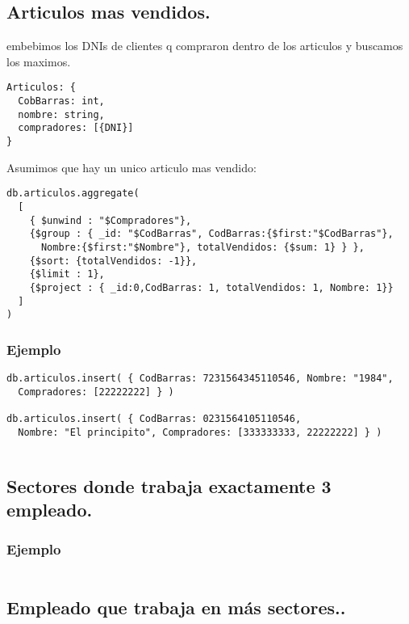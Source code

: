 \subsection{Articulos mas vendidos.}
embebimos los DNIs de clientes q compraron dentro de los articulos y buscamos los maximos.

\begin{lstlisting}
Articulos: {
  CobBarras: int,
  nombre: string,
  compradores: [{DNI}]
}
\end{lstlisting}

Asumimos que hay un unico articulo mas vendido:
\begin{lstlisting}
db.articulos.aggregate(
  [
    { $unwind : "$Compradores"},
    {$group : { _id: "$CodBarras", CodBarras:{$first:"$CodBarras"},
      Nombre:{$first:"$Nombre"}, totalVendidos: {$sum: 1} } },
    {$sort: {totalVendidos: -1}},
    {$limit : 1},
    {$project : { _id:0,CodBarras: 1, totalVendidos: 1, Nombre: 1}}
  ]
)
\end{lstlisting}

\subsubsection{Ejemplo}

\begin{lstlisting}
db.articulos.insert( { CodBarras: 7231564345110546, Nombre: "1984",
  Compradores: [22222222] } )

db.articulos.insert( { CodBarras: 0231564105110546,
  Nombre: "El principito", Compradores: [333333333, 22222222] } )
\end{lstlisting}

\begin{lstlisting}
\end{lstlisting}

\subsection{Sectores donde trabaja exactamente 3 empleado.}

\subsubsection{Ejemplo}
\begin{lstlisting}
\end{lstlisting}

\subsection{Empleado que trabaja en más sectores..}


